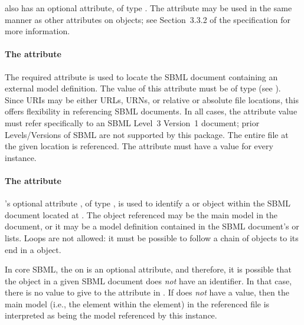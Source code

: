 \ExternalModelDefinition also has an optional  attribute, of type .  The  attribute may be used in the same manner as other  attributes on \sbmlthreecore objects; see Section~3.3.2 of the \sbmlthreecore specification for more information.


\paragraph{The \fixttspace{} attribute}

The required attribute  is used to locate the SBML document containing an external model definition.  The value of this attribute must be of type  (see ). Since URIs may be either URLs, URNs, or relative or absolute file locations, this offers flexibility in referencing SBML documents.  In all cases, the  attribute value must refer specifically to an SBML Level~3 Version~1 document; prior Levels/Versions of SBML are not supported by this package.  The entire file at the given location is referenced.  The  attribute must have a value for every \ExternalModelDefinition instance.

\paragraph{The \fixttspace{} attribute}

\ExternalModelDefinition's optional attribute , of type , is used to identify a \Model or \ExternalModelDefinition object within the SBML document located at .  The object referenced may be the main model in the document, or it may be a model definition contained in the SBML document's  or  lists.  Loops are not allowed: it must be possible to follow a chain of \ExternalModelDefinition objects to its end in a \Model object.

In core SBML, the  on \Model is an optional attribute, and therefore, it is possible that the \Model object in a given SBML document does \emph{not} have an identifier.  In that case, there is no value to give to the  attribute in \ExternalModelDefinition.  If  does \emph{not} have a value, then the main model (i.e., the  element within the  element) in the referenced file is interpreted as being the model referenced by this \ExternalModelDefinition instance.

